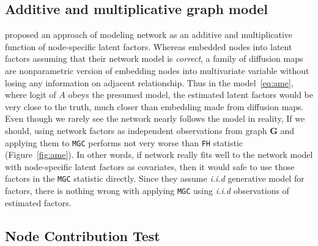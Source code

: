 \documentclass[12pt]{article}
\theoremstyle{definition}
\begin{document}
\subsection{Additive and multiplicative graph model}
\label{ssec:ame}

\cite{hoff2002latent} proposed an approach of modeling network as an additive and multiplicative function of node-specific latent factors. Whereas \cite{fosdick2015testing} embedded nodes into latent factors assuming that their network model is \textit{correct}, a family of diffusion maps are nonparametric version of embedding nodes into multivariate variable without losing any information on adjacent relationship. Thus in the model~\ref{eq:ame}, where logit of $A$ obeys the presumed model, the estimated latent factors would be very close to the truth, much closer than embedding made from diffusion maps. Even though we rarely see the network nearly follows the model in reality, If we should, using network factors as independent observations from graph \textbf{G} and applying them to \texttt{MGC} performs not very worse than \texttt{FH} statistic (Figure~\ref{fig:ame}). In other words, if network really fits well to the network model with node-specific latent factors as covariates, then it would safe to use those factors in the \texttt{MGC} statistic directly. Since they assume \textit{i.i.d} generative model for factors, there is nothing wrong with applying \texttt{MGC} using \textit{i.i.d} observations of estimated factors.

\subsection{Node Contribution Test}
\label{ssec:node}
\end{document}
